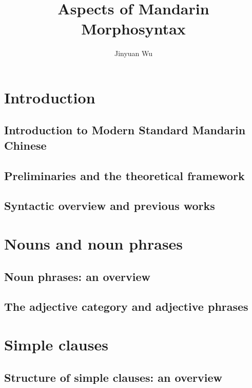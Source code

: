 \documentclass[UTF8, a4paper, oneside, scheme=plain]{ctexbook}
\title{Aspects of Mandarin Morphosyntax}
\author{Jinyuan Wu}
\numberwithin{equation}{chapter}
\begin{document}
\maketitle

\automath

\part{Introduction}

\chapter{Introduction to Modern Standard Mandarin Chinese}



\chapter{Preliminaries and the theoretical framework}



\chapter{Syntactic overview and previous works}



\part{Nouns and noun phrases}

\chapter{Noun phrases: an overview}



\chapter{The adjective category and adjective phrases}



\part{Simple clauses}

\chapter{Structure of simple clauses: an overview}\label{chap:basic-clause-structure}
\end{document}
